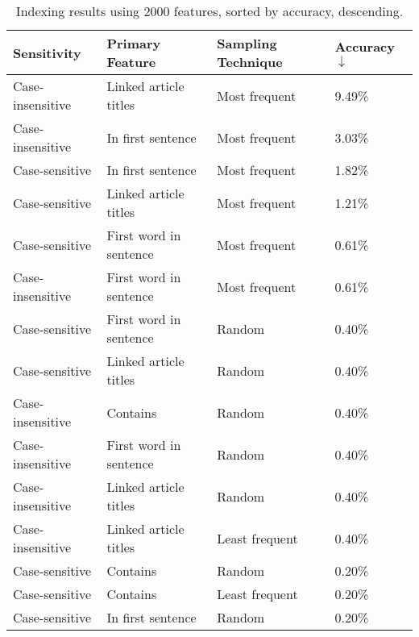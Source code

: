 \begin{center}
\begin{table}[h]
\caption{Indexing results using 2000 features, sorted by accuracy, descending.}
\begin{tabular}{llll}
\label{tab:results-sorted}
\textbf{Sensitivity} & \textbf{Primary Feature}       & \textbf{Sampling Technique} & \textbf{Accuracy $\downarrow$} \\ \hline
Case-insensitive     & Linked article titles  & Most frequent               & 9.49\%             \\ \hline
Case-insensitive     & In first sentence      & Most frequent               & 3.03\%             \\ \hline
Case-sensitive       & In first sentence      & Most frequent               & 1.82\%             \\ \hline
Case-sensitive       & Linked article titles  & Most frequent               & 1.21\%             \\ \hline
Case-sensitive       & First word in sentence & Most frequent               & 0.61\%             \\ \hline
Case-insensitive     & First word in sentence & Most frequent               & 0.61\%             \\ \hline
Case-sensitive       & First word in sentence & Random                      & 0.40\%             \\ \hline
Case-sensitive       & Linked article titles  & Random                      & 0.40\%             \\ \hline
Case-insensitive     & Contains               & Random                      & 0.40\%             \\ \hline
Case-insensitive     & First word in sentence & Random                      & 0.40\%             \\ \hline
Case-insensitive     & Linked article titles  & Random                      & 0.40\%             \\ \hline
Case-insensitive     & Linked article titles  & Least frequent              & 0.40\%             \\ \hline
Case-sensitive       & Contains               & Random                      & 0.20\%             \\ \hline
Case-sensitive       & Contains               & Least frequent              & 0.20\%             \\ \hline
Case-sensitive       & In first sentence      & Random                      & 0.20\%             \\ \hline

\end{tabular}
\end{table}
\end{center}
